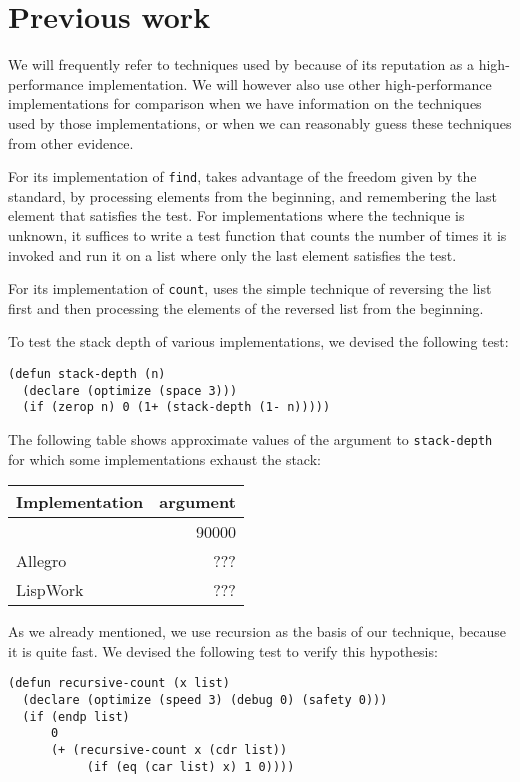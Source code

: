 \section{Previous work}

We will frequently refer to techniques used by \sbcl{} because of its
reputation as a high-performance implementation.  We will however also
use other high-performance implementations for comparison when we have
information on the techniques used by those implementations, or when
we can reasonably guess these techniques from other evidence.

For its implementation of \texttt{find}, \sbcl{} takes advantage of
the freedom given by the standard, by processing elements from the
beginning, and remembering the last element that satisfies the test.
For implementations where the technique is unknown, it suffices to
write a test function that counts the number of times it is invoked
and run it on a list where only the last element satisfies the test.

For its implementation of \texttt{count}, \sbcl{} uses the simple
technique of reversing the list first and then processing the elements
of the reversed list from the beginning.

To test the stack depth of various implementations, we devised the
following test:

{\small\begin{verbatim}
(defun stack-depth (n)
  (declare (optimize (space 3)))
  (if (zerop n) 0 (1+ (stack-depth (1- n)))))
\end{verbatim}}

The following table shows approximate values of the argument to
\texttt{stack-depth} for which some implementations exhaust the stack:


\begin{tabular}{|l|r|}
\hline
Implementation & argument\\
\hline
\hline
\sbcl{} & 90000\\
\hline
Allegro & ???\\
\hline
LispWork & ???\\
\hline
\end{tabular}

As we already mentioned, we use recursion as the basis of our
technique, because it is quite fast.  We devised the following test to
verify this hypothesis:

{\small\begin{verbatim}
(defun recursive-count (x list)
  (declare (optimize (speed 3) (debug 0) (safety 0)))
  (if (endp list)
      0
      (+ (recursive-count x (cdr list))
           (if (eq (car list) x) 1 0))))
\end{verbatim}}

